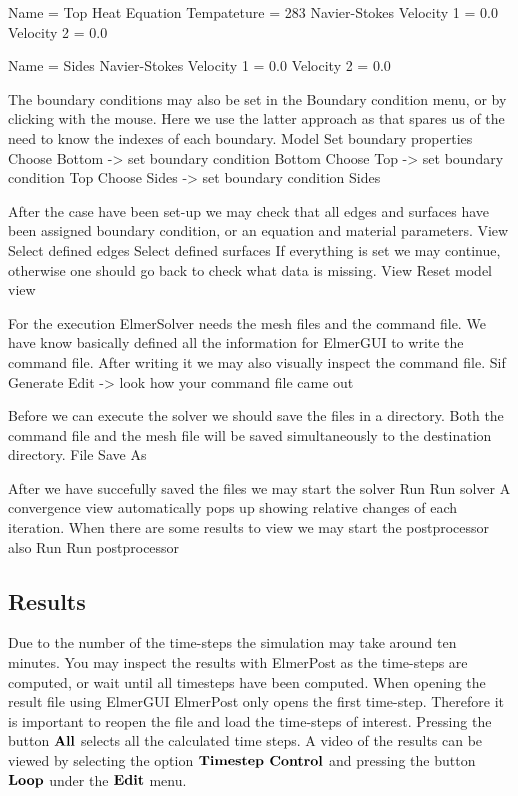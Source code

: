     Name = Top
    Heat Equation
      Tempateture = 283
    Navier-Stokes 
      Velocity 1 = 0.0
      Velocity 2 = 0.0
 
    Name = Sides
    Navier-Stokes 
      Velocity 1 = 0.0
      Velocity 2 = 0.0
\ttend   

The boundary conditions may also be set in the Boundary condition menu, or 
by clicking with the mouse. Here we use the latter approach as that spares us of the 
need to know the indexes of each boundary.
\ttbegin
Model
  Set boundary properties
    Choose Bottom -> set boundary condition Bottom
    Choose Top -> set boundary condition Top
    Choose Sides -> set boundary condition Sides
\ttend

After the case have been set-up we may check that all edges and surfaces have been assigned 
boundary condition, or an equation and material parameters.
\ttbegin
View
  Select defined edges 
  Select defined surfaces
\ttend 
If everything is set we may continue, otherwise one should go back to check what data is missing.
\ttbegin
View
  Reset model view
\ttend

For the execution 
ElmerSolver needs the mesh files and the command file. We have know basically defined
all the information for ElmerGUI to write the command file. After writing it we may also visually 
inspect the command file.
\ttbegin
Sif 
  Generate
  Edit -> look how your command file came out  
\ttend

Before we can execute the solver we should save the files in a directory. Both the command file and
the mesh file will be saved simultaneously to the destination directory.
\ttbegin
File 
  Save As
\ttend

After we have succefully saved the files we may start the solver
\ttbegin
Run
  Run solver
\ttend
A convergence view automatically pops up showing relative changes of each iteration.
When there are some results to view we may start the postprocessor also
\ttbegin
Run
  Run postprocessor
\ttend


\subsection*{Results}

Due to the number of the time-steps the simulation may take around ten minutes.
You may inspect the results with ElmerPost as the time-steps are computed, or
wait until all timesteps have been computed. 
When opening the result file using ElmerGUI ElmerPost only opens the first time-step.
Therefore it is important to reopen the file and load the time-steps of interest.
Pressing the button $\bf{All}$ selects all the calculated time steps.
A video of the results can be viewed by selecting the option $\bf{Timestep}$ 
$\bf{Control}$ and pressing the button $\bf{Loop}$ under the $\bf{Edit}$ menu.


